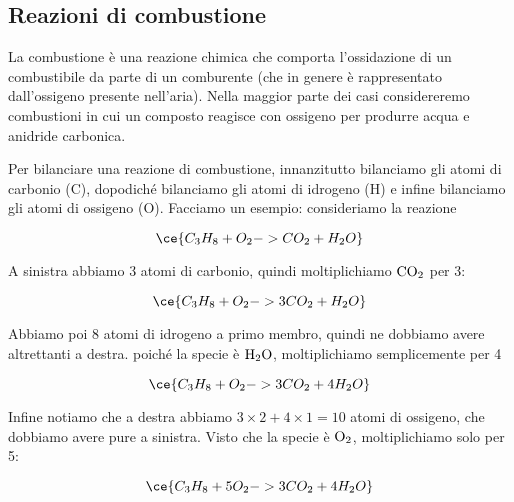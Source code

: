 \subsection{Reazioni di combustione}
La combustione è una reazione chimica che comporta l'ossidazione di un combustibile da parte di un comburente (che in genere è rappresentato dall'ossigeno presente nell'aria). Nella maggior parte dei casi considereremo combustioni in cui un composto reagisce con ossigeno per produrre acqua e anidride carbonica.

Per bilanciare una reazione di combustione, innanzitutto bilanciamo gli atomi di carbonio (C), dopodiché bilanciamo gli atomi di idrogeno (H) e infine bilanciamo gli atomi di ossigeno (O). Facciamo un esempio: consideriamo la reazione

$$\ce{C_3H_8 + O_2 -> CO_2 + H_2O}$$

A sinistra abbiamo 3 atomi di carbonio, quindi moltiplichiamo $\rm CO_2$ per 3:

$$\ce{C_3H_8 + O_2 -> 3CO_2 + H_2O}$$

Abbiamo poi 8 atomi di idrogeno a primo membro, quindi ne dobbiamo avere altrettanti a destra. poiché la specie è $\rm H_2O$, moltiplichiamo semplicemente per 4

$$\ce{C_3H_8 + O_2 -> 3CO_2 + 4H_2O}$$

Infine notiamo che a destra abbiamo $3 \times 2 + 4 \times 1=10$ atomi di ossigeno, che dobbiamo avere pure a sinistra. Visto che la specie è $\rm O_2$, moltiplichiamo solo per 5:

$$\ce{C_3H_8 + 5O_2 -> 3CO_2 + 4H_2O}$$
\newpage

